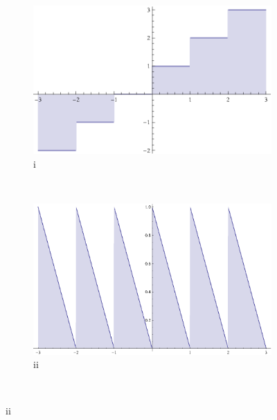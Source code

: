 \documentclass[12pt]{article}
\begin{document}
\begin{figure}[!hblp]
        \centering
        \begin{subfigure}[b]{0.5\textwidth}
                \includegraphics[width=\textwidth]{1.eps}
                \caption{i}
        \end{subfigure}%
        ~ %
        \begin{subfigure}[b]{0.5\textwidth}
                \includegraphics[width=\textwidth]{2.eps}
                \caption{ii}

 \end{subfigure}\\


\end{figure}
\end{document}
